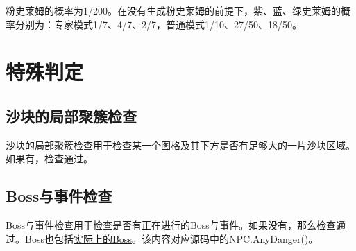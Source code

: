 粉史莱姆的概率为1/200。在没有生成粉史莱姆的前提下，紫、蓝、绿史莱姆的概率分别为：专家模式1/7、4/7、2/7，普通模式1/10、27/50、18/50。

\section{特殊判定}
\subsection{沙块的局部聚簇检查}
沙块的局部聚簇检查用于检查某一个图格及其下方是否有足够大的一片沙块区域。如果有，检查通过。

\subsection{Boss与事件检查}
Boss与事件检查用于检查是否有正在进行的Boss与事件。如果没有，那么检查通过。Boss也包括\hyperref[app10]{实际上的Boss}。该内容对应源码中的NPC.AnyDanger()。
